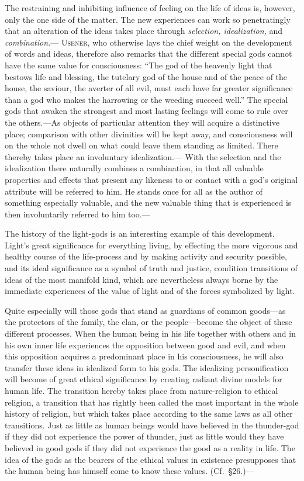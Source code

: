 \documentclass[12pt,a4paper]{book}
\newcommand{\opage}[1]{\marginnote{\footnotesize\textit{[#1]}}}
\begin{document}
The restraining and inhibiting influence of feeling on the life of ideas is, however, only the
one side of the matter. The new experiences can work so penetratingly that an alteration of
the ideas takes place through \emph{selection, idealization,} and \emph{combination.}---%
\textsc{Usener}, who otherwise lays the chief weight on the development of words and ideas,
therefore also remarks that the different special gods cannot have the same value for
consciousness: ``The god of the heavenly light that bestows life and blessing, the tutelary
god of the house and of the peace of the house, the saviour, the averter of all evil, must each
have far greater significance than a god who makes the harrowing or the weeding succeed well.''
The special gods that awaken the strongest and most lasting feelings will come to rule over the
others.---As objects of particular attention they will acquire a distinctive place; comparison
with other divinities will be kept away, and consciousness will on the whole not dwell on what
could leave them standing as limited. There thereby takes place an involuntary idealization.---%
With the selection and the idealization there naturally combines a combination, in that all
valuable properties and effects that present any likeness to or contact with a god's original
attribute will be referred to him. He stands once for all as the author of something especially
valuable, and the new valuable thing that is experienced is then involuntarily referred to him
too.---

The history of the light-gods is an interesting example of this development. Light's great
significance for everything living, by effecting the more vigorous and healthy course of the
life-process and by making activity and security possible, and its ideal significance as 
\opage{97}a
symbol of truth and justice, condition transitions of ideas of the most manifold kind, which
are nevertheless always borne by the immediate experiences of the value of light and of the
forces symbolized by light.

Quite especially will those gods that stand as guardians of common goods---as the protectors of
the family, the clan, or the people---become the object of these different processes. When the
human being in his life together with others and in his own inner life experiences the
opposition between good and evil, and when this opposition acquires a predominant place in his
consciousness, he will also transfer these ideas in idealized form to his gods. The idealizing
personification will become of great ethical significance by creating radiant divine models for
human life. The transition hereby takes place from nature-religion to ethical religion, a
transition that has rightly been called the most important in the whole history of religion, but
which takes place according to the same laws as all other transitions. Just as little as human
beings would have believed in the thunder-god if they did not experience the power of thunder,
just as little would they have believed in good gods if they did not experience the good as a
reality in life. The idea of the gods as the bearers of the ethical values in existence
presupposes that the human being has himself come to know these values. (Cf.\ §26.)---
\end{document}

